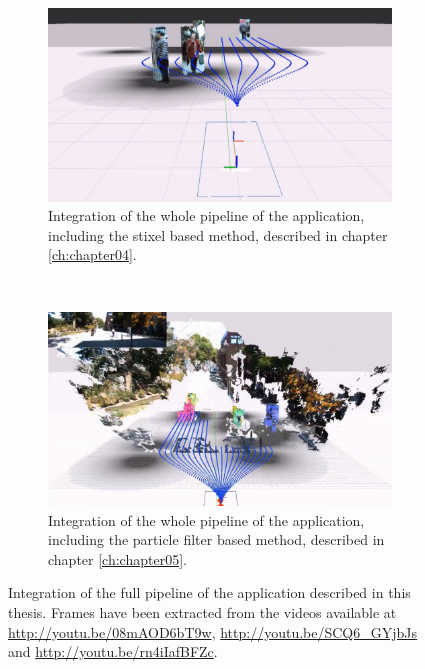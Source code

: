 \begin{figure}[h]
\centering
  \begin{subfigure}[b]{\textwidth}
    \centering
    \includegraphics[width=\textwidth, height=0.75\textwidth]{stixels_whole_pipeline}
    \caption{Integration of the whole pipeline of the application, including the stixel based method, described in chapter \ref{ch:chapter04}.}\label{fig:cp07_stixels_whole_pipeline}
  \end{subfigure}
  ~
  \begin{subfigure}[b]{\textwidth}
    \centering
    \includegraphics[width=\textwidth, height=0.75\textwidth]{particle_filter_whole_pipeline}
    \caption{Integration of the whole pipeline of the application, including the particle filter based method, described in chapter \ref{ch:chapter05}.}\label{fig:cp07_particle_filter_whole_pipeline}
  \end{subfigure}
  \caption{Integration of the full pipeline of the application described in this thesis. Frames have been extracted from the videos available at \url{http://youtu.be/08mAOD6bT9w}, \url{http://youtu.be/SCQ6_GYjbJs} and \url{http://youtu.be/rn4iIafBFZc}.}\label{fig:cp07_whole_pipeline}
\end{figure}

